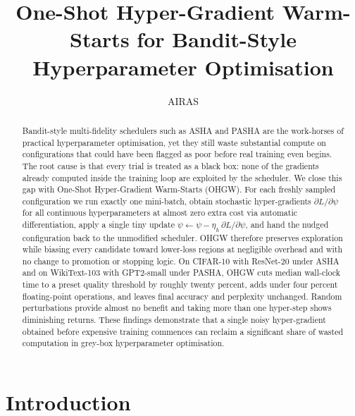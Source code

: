 \documentclass{article} %
\title{One-Shot Hyper-Gradient Warm-Starts for Bandit-Style Hyperparameter Optimisation}
\author{AIRAS}
\begin{document}
\maketitle

\begin{abstract}
Bandit-style multi-fidelity schedulers such as ASHA and PASHA are the work-horses of practical hyperparameter optimisation, yet they still waste substantial compute on configurations that could have been flagged as poor before real training even begins. The root cause is that every trial is treated as a black box: none of the gradients already computed inside the training loop are exploited by the scheduler. We close this gap with One-Shot Hyper-Gradient Warm-Starts (OHGW). For each freshly sampled configuration we run exactly one mini-batch, obtain stochastic hyper-gradients \(\partial L/\partial \psi\) for all continuous hyperparameters at almost zero extra cost via automatic differentiation, apply a single tiny update \(\psi \leftarrow \psi - \eta_h\, \partial L/\partial \psi\), and hand the nudged configuration back to the unmodified scheduler. OHGW therefore preserves exploration while biasing every candidate toward lower-loss regions at negligible overhead and with no change to promotion or stopping logic. On CIFAR-10 with ResNet-20 under ASHA and on WikiText-103 with GPT2-small under PASHA, OHGW cuts median wall-clock time to a preset quality threshold by roughly twenty percent, adds under four percent floating-point operations, and leaves final accuracy and perplexity unchanged. Random perturbations provide almost no benefit and taking more than one hyper-step shows diminishing returns. These findings demonstrate that a single noisy hyper-gradient obtained before expensive training commences can reclaim a significant share of wasted computation in grey-box hyperparameter optimisation.
\end{abstract}

\section{Introduction}
\label{sec:intro}
\end{document}

